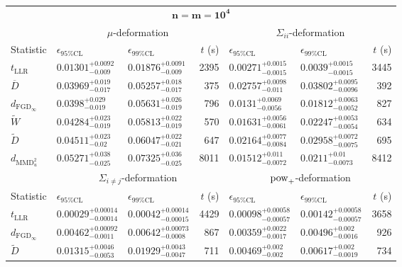 \begin{tabular}{l|llr|llr}
	\toprule
	\multicolumn{7}{c}{$\mathbf{n=m=10^{4}}$} \\
	\multicolumn{1}{c}{} & \multicolumn{3}{c}{$\mu$-deformation} & \multicolumn{3}{c}{$\Sigma_{ii}$-deformation} \\
	Statistic & $\epsilon_{95\%\mathrm{CL}}$ & $\epsilon_{99\%\mathrm{CL}}$ & $t$ (s) & $\epsilon_{95\%\mathrm{CL}}$ & $\epsilon_{99\%\mathrm{CL}}$ & $t$ (s) \\
	\midrule
	$t_{\mathrm{LLR}}$ & $0.01301_{-0.009}^{+0.0092}$ & $0.01876_{-0.009}^{+0.0091}$ & 2395 & $0.00271_{-0.0015}^{+0.0015}$ & $0.0039_{-0.0015}^{+0.0015}$ & 3445 \\
	$\overline{D}$ & $0.03969_{-0.017}^{+0.019}$ & $0.05257_{-0.017}^{+0.018}$ & 375 & $0.02757_{-0.011}^{+0.0098}$ & $0.03802_{-0.0096}^{+0.0095}$ & 392 \\
	$d_{\mathrm{FGD}_{\infty}}$ & $0.0398_{-0.019}^{+0.029}$ & $0.05631_{-0.019}^{+0.026}$ & 796 & $0.0131_{-0.0056}^{+0.0069}$ & $0.01812_{-0.0052}^{+0.0063}$ & 827 \\
	$\widetilde{W}$ & $0.04284_{-0.019}^{+0.023}$ & $0.05813_{-0.019}^{+0.022}$ & 570 & $0.01631_{-0.0061}^{+0.0056}$ & $0.02247_{-0.0054}^{+0.0053}$ & 634 \\
	$\widetilde{D}$ & $0.04511_{-0.02}^{+0.023}$ & $0.06047_{-0.021}^{+0.022}$ & 647 & $0.02164_{-0.0084}^{+0.0077}$ & $0.02958_{-0.0075}^{+0.0072}$ & 695 \\
	$d_{\mathrm{MMD}^{2}_{u}}$ & $0.05271_{-0.025}^{+0.038}$ & $0.07325_{-0.025}^{+0.036}$ & 8011 & $0.01512_{-0.0072}^{+0.011}$ & $0.0211_{-0.0073}^{+0.01}$ & 8412 \\
	\toprule
	\multicolumn{1}{c}{} & \multicolumn{3}{c}{$\Sigma_{i\neq j}$-deformation} & \multicolumn{3}{c}{$\rm{pow}_{+}$-deformation} \\
	Statistic & $\epsilon_{95\%\mathrm{CL}}$ & $\epsilon_{99\%\mathrm{CL}}$ & $t$ (s) & $\epsilon_{95\%\mathrm{CL}}$ & $\epsilon_{99\%\mathrm{CL}}$ & $t$ (s) \\
	\midrule
	$t_{\mathrm{LLR}}$ & $0.00029_{-0.00014}^{+0.00014}$ & $0.00042_{-0.00015}^{+0.00014}$ & 4429 & $0.00098_{-0.00057}^{+0.00058}$ & $0.00142_{-0.00057}^{+0.00058}$ & 3658 \\
	$d_{\mathrm{FGD}_{\infty}}$ & $0.00462_{-0.0011}^{+0.00092}$ & $0.00642_{-0.0008}^{+0.00073}$ & 867 & $0.00359_{-0.0017}^{+0.0022}$ & $0.00496_{-0.0016}^{+0.002}$ & 926 \\
	$\widetilde{D}$ & $0.01315_{-0.0053}^{+0.0046}$ & $0.01929_{-0.0047}^{+0.0043}$ & 711 & $0.00469_{-0.002}^{+0.002}$ & $0.00617_{-0.0019}^{+0.002}$ & 734 \\

\end{tabular}
